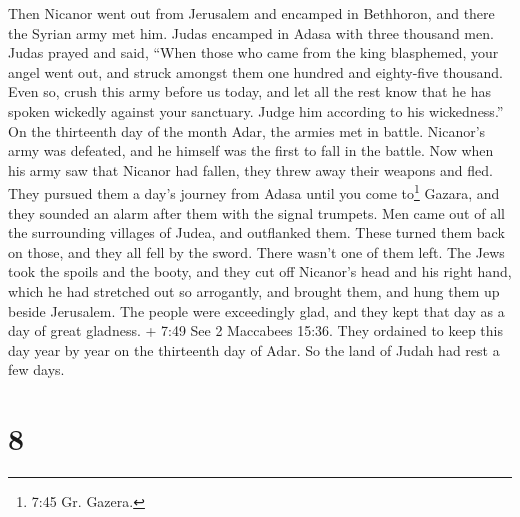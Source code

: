  Then Nicanor went out from Jerusalem and encamped in
Bethhoron, and there the Syrian army met him.  Judas
encamped in Adasa with three thousand men. Judas prayed and said,
 ``When those who came from the king blasphemed, your angel
went out, and struck amongst them one hundred and eighty-five thousand.
 Even so, crush this army before us today, and let all the
rest know that he has spoken wickedly against your sanctuary. Judge him
according to his wickedness.''  On the thirteenth day of
the month Adar, the armies met in battle. Nicanor's army was defeated,
and he himself was the first to fall in the battle.  Now
when his army saw that Nicanor had fallen, they threw away their weapons
and fled.  They pursued them a day's journey from Adasa
until you come to\footnote{7:45 Gr. Gazera.} Gazara, and they sounded an
alarm after them with the signal trumpets.  Men came out of
all the surrounding villages of Judea, and outflanked them. These turned
them back on those, and they all fell by the sword. There wasn't one of
them left.  The Jews took the spoils and the booty, and
they cut off Nicanor's head and his right hand, which he had stretched
out so arrogantly, and brought them, and hung them up beside Jerusalem.
 The people were exceedingly glad, and they kept that day
as a day of great gladness.  + 7:49 See 2 Maccabees 15:36.
They ordained to keep this day year by year on the thirteenth day of
Adar.  So the land of Judah had rest a few days.

\hypertarget{section-7}{%
\section{8}\label{section-7}}

